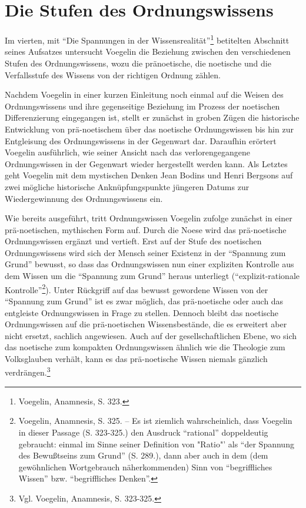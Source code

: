

\section{Die Stufen des Ordnungswissens}

Im vierten, mit "`Die Spannungen in der Wissensrealität"'\footnote{Voegelin,
  Anamnesis, S. 323.} betitelten Abschnitt seines Aufsatzes untersucht Voegelin
die Beziehung zwischen den verschiedenen Stufen des Ordnungswissens, wozu die
pränoetische, die noetische und die Verfallsstufe des Wissens von der
richtigen Ordnung zählen.

Nachdem Voegelin in einer kurzen Einleitung noch einmal auf die Weisen des
Ordnungswissens und ihre gegenseitige Beziehung im Prozess der noetischen
Differenzierung eingegangen ist, stellt er zunächst in groben Zügen die
historische Entwicklung von prä-noetischem über das noetische Ordnungswissen
bis hin zur Entgleisung des Ordnungswissens in der Gegenwart dar. Daraufhin
erörtert Voegelin ausführlich, wie seiner Ansicht nach das verlorengegangene
Ordnungswissen in der Gegenwart wieder hergestellt werden kann. Als Letztes
geht Voegelin mit dem mystischen Denken Jean Bodins und Henri Bergsons auf
zwei mögliche historische Anknüpfungspunkte jüngeren Datums zur
Wiedergewinnung des Ordnungswissens ein.

Wie bereits ausgeführt, tritt Ordnungswissen Voegelin zufolge zunächst in
einer prä-noetischen, mythischen Form auf. Durch die Noese wird das
prä-noetische Ordnungswissen ergänzt und vertieft. Erst auf der Stufe des
noetischen Ordnungswissens wird sich der Mensch seiner Existenz in der
"`Spannung zum Grund"' bewusst, so dass das Ordnungswissen nun einer
expliziten Kontrolle aus dem Wissen um die "`Spannung zum Grund"' heraus
unterliegt ("`explizit-rationale Kontrolle"'\footnote{Voegelin, Anamnesis, S.
  325. -- Es ist ziemlich wahrscheinlich, dass Voegelin in dieser Passage (S.
  323-325.) den Ausdruck "`rational"' doppeldeutig gebraucht: einmal im Sinne
  seiner Definition von "Ratio"' als "`der Spannung des Bewußtseins zum
  Grund"' (S. 289.), dann aber auch in dem (dem gewöhnlichen Wortgebrauch
  näherkommenden) Sinn von "`begriffliches Wissen"' bzw. "`begriffliches
  Denken"'.}). Unter Rückgriff auf das bewusst gewordene Wissen von der
"`Spannung zum Grund"' ist es zwar möglich, das prä-noetische oder auch das
entgleiste Ordnungswissen in Frage zu stellen. Dennoch bleibt das noetische
Ordnungswissen auf die prä-noetischen Wissensbestände, die es erweitert aber
nicht ersetzt, sachlich angewiesen. Auch auf der gesellschaftlichen Ebene, wo
sich das noetische zum kompakten Ordnungswissen ähnlich wie die Theologie zum
Volksglauben verhält, kann es das prä-noetische Wissen niemals gänzlich
verdrängen.\footnote{Vgl. Voegelin, Anamnesis, S. 323-325.}

